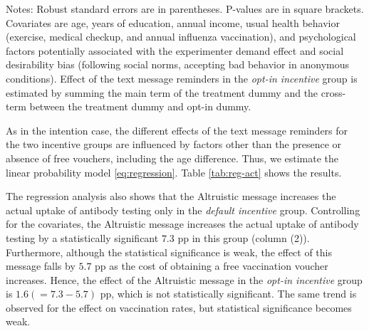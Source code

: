 \documentclass[
      12pt,
    a4paper
]{article}
\begin{document}
\begin{table}
\begin{threeparttable}
\begin{tablenotes}
\item Notes: Robust standard errors are in parentheses. P-values are in square brackets. Covariates are age, years of education, annual income, usual health behavior (exercise, medical checkup, and annual influenza vaccination), and psychological factors potentially associated with the experimenter demand effect and social desirability bias (following social norms, accepting bad behavior in anonymous conditions). Effect of the text message reminders in the \emph{opt-in incentive} group is estimated by summing the main term of the treatment dummy and the cross-term between the treatment dummy and opt-in dummy.
\end{tablenotes}
\end{threeparttable}
\end{table}

As in the intention case, the different effects of the text message reminders for the two incentive groups are influenced by factors other than the presence or absence of free vouchers, including the age difference. Thus, we estimate the linear probability model \eqref{eq:regression}. Table \ref{tab:reg-act} shows the results.

The regression analysis also shows that the Altruistic message increases the actual uptake of antibody testing only in the \emph{default incentive} group. Controlling for the covariates, the Altruistic message increases the actual uptake of antibody testing by a statistically significant \(7.3\) pp in this group (column (2)). Furthermore, although the statistical significance is weak, the effect of this message falls by \(5.7\) pp as the cost of obtaining a free vaccination voucher increases. Hence, the effect of the Altruistic message in the \emph{opt-in incentive} group is \(1.6 (=7.3-5.7)\) pp, which is not statistically significant. The same trend is observed for the effect on vaccination rates, but statistical significance becomes weak.
\end{document}
